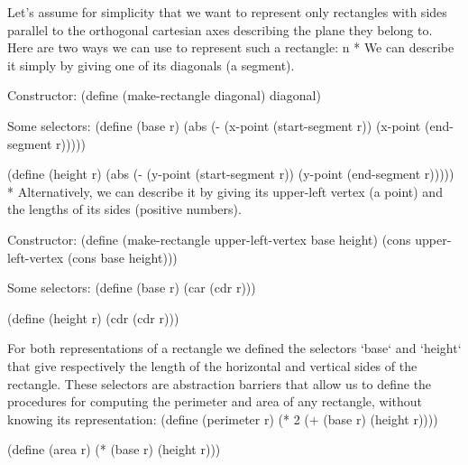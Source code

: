 Let's assume for simplicity that we want to represent only rectangles with sides parallel to the orthogonal cartesian axes describing the plane they belong to.
Here are two ways we can use to represent such a rectangle:
\begitems\style n
* We can describe it simply by giving one of its diagonals (a segment).

Constructor:
\begtt\scm
(define (make-rectangle diagonal)
  diagonal)
\endtt

Some selectors:
\begtt\scm
(define (base r)
  (abs (- (x-point (start-segment r))
          (x-point (end-segment r)))))

(define (height r)
  (abs (- (y-point (start-segment r))
          (y-point (end-segment r)))))
\endtt
* Alternatively, we can describe it by giving its upper-left vertex (a point) and the lengths of its sides (positive numbers).
\smallskip

Constructor:
\begtt\scm
(define (make-rectangle upper-left-vertex base height)
  (cons upper-left-vertex
        (cons base height)))
\endtt

Some selectors:
\begtt\scm
(define (base r)
  (car (cdr r)))

(define (height r)
  (cdr (cdr r)))
\endtt
\enditems
\begtt\scm
\endtt

For both representations of a rectangle we defined the selectors `base` and `height` that give respectively the length of the horizontal and vertical sides of the rectangle.
These selectors are abstraction barriers that allow us to define the procedures for computing the perimeter and area of any rectangle, without knowing its representation:
\begtt\scm
(define (perimeter r)
  (* 2 (+ (base r)
          (height r))))

(define (area r)
  (* (base r)
     (height r)))
\endtt
